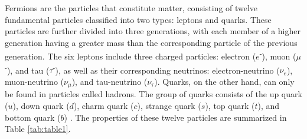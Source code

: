Fermions are the particles that constitute matter, consisting of twelve fundamental particles classified into two types: leptons and quarks. These particles are further divided into three generations, with each member of a higher generation having a greater mass than the corresponding particle of the previous generation. The six leptons include three charged particles: electron ($e$\textsuperscript{-}), muon (${\mu}$\textsuperscript{-}), and tau (${\tau}$\textsuperscript{-}), as well as their corresponding neutrinos: electron-neutrino ($\nu_{e}$), muon-neutrino ($\nu_{\mu}$), and tau-neutrino ($\nu_{\tau}$). Quarks, on the other hand, can only be found in particles called hadrons. The group of quarks consists of the up quark ($u$), down quark ($d$), charm quark ($c$), strange quark ($s$), top quark ($t$), and bottom quark ($b$) \cite{griff,thomson_2013}. The properties of these twelve particles are summarized in Table \ref{tab:table1}.

